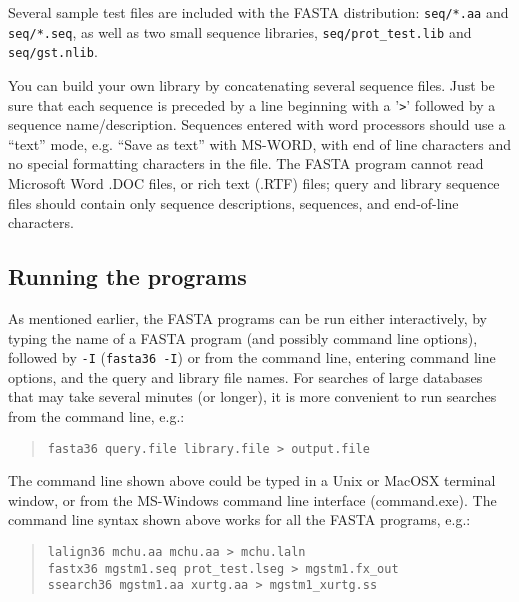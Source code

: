\documentclass[11pt]{article}
\begin{document}
Several sample test files are included with the FASTA distribution:
\texttt{seq/*.aa} and \texttt{seq/*.seq}, as well as two small sequence
libraries, \texttt{seq/prot\_test.lib} and \texttt{seq/gst.nlib}.

You can build your own library by concatenating several sequence
files.  Just be sure that each sequence is preceded by a line
beginning with a '\texttt{>}' followed by a sequence name/description.  Sequences
entered with word processors should use a ``text'' mode, e.g. ``Save as
text'' with MS-WORD, with end of line characters and no special
formatting characters in the file.  The FASTA program cannot read
Microsoft Word .DOC files, or rich text (.RTF) files; query and
library sequence files should contain only sequence descriptions,
sequences, and end-of-line characters.

\subsection{Running the programs}
As mentioned earlier, the FASTA programs can be run either
interactively, by typing the name of a FASTA program (and possibly
command line options), followed by \texttt{-I} (\texttt{fasta36 -I})
or from the command line, entering command line options, and the
query and library file names. For searches of large databases that
may take several minutes (or longer), it is more convenient
to run searches from the command line, e.g.:
\begin{quote}
\begin{verbatim}
fasta36 query.file library.file > output.file
\end{verbatim}
\end{quote}
The command line shown above could be typed in a Unix or MacOSX
terminal window, or from the MS-Windows command line interface
(command.exe).  The command line syntax shown above works for all
the FASTA programs, e.g.:
\begin{quote}
\begin{verbatim}
lalign36 mchu.aa mchu.aa > mchu.laln
fastx36 mgstm1.seq prot_test.lseg > mgstm1.fx_out
ssearch36 mgstm1.aa xurtg.aa > mgstm1_xurtg.ss
\end{verbatim}
\end{quote}
\end{document}
